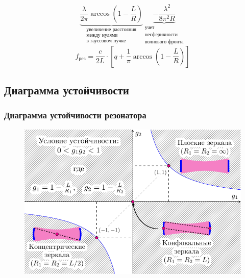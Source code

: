 \begin{frame}[c]
\begin{equation*}
			\underbrace{\frac{\lambda}{2\pi}\arccos\left(1-\frac{L}{R}\right)}_{\substack{\text{увеличение расстояния}\\\text{между нулями}\\\text{в гауссовом пучке}}}
			\underbrace{-{\frac{\lambda^2}{8\pi^2 R}}}_{\substack{\text{учет}\\\text{несферичности}\\\text{волнового фронта}}}
	\end{equation*}
	\begin{equation*}
		f_\text{рез}=\frac{c}{2L}\cdot\left[
			q+\frac{1}{\pi}\arccos\left(1-\frac{L}{R}\right)
		\right]
	\end{equation*}
\end{frame}


\subsection{Диаграмма устойчивости}
\begin{frame}[c]%
	\frametitle{Диаграмма устойчивости резонатора}
	\vspace{-1.07em}
	\begin{figure}[H]
		\centering
		\includegraphics[scale=1.1]{ris/diagram}
		\label{fig:chem}
	\end{figure}	
\end{frame}

